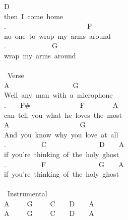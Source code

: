 {D\\
then\ I\ come\ home\\
.\ \ \ \ \ \ \ \ \ \ \ \ \ \ \ \ \ \ \ \ \ \ \ F\\
no\ one\ to\ wrap\ my\ arms\ around\\
.\ \ \ \ \ \ \ \ \ \ \ \ \ G\\
wrap\ my\ arms\ around\\
\\
\lbrack\ Verse\rbrack\\
A\ \ \ \ \ \ \ \ \ \ \ \ \ \ \ \ \ \ G\\
Well\ any\ man\ with\ a\ microphone\ \\
.\ \ \ \ F\#\ \ \ \ \ \ \ \ \ \ \ \ \ \ F\ \ \ \ \ \ \ \ A\\
can\ tell\ you\ what\ he\ loves\ the\ most\\
A\ \ \ \ \ \ \ \ \ \ \ \ \ \ \ \ \ \ \ \ G\\
And\ you\ know\ why\ you\ love\ at\ all\ \\
.\ \ \ \ \ \ \ \ \ \ C\ \ \ \ \ \ \ \ \ \ \ \ \ \ \ D\ \ \ \ A\\
if\ you're\ thinking\ of\ the\ holy\ ghost\\
.\ \ \ \ \ \ \ \ \ \ F\ \ \ \ \ \ \ \ \ \ \ \ \ \ \ G\ \ \ \ A\\
if\ you're\ thinking\ of\ the\ holy\ ghost\\
\\
\lbrack\ Instrumental\rbrack\\
A\ \ \ \ \ G\ \ \ \ \ C\ \ \ \ D\ \ \ \ A\\
A\ \ \ \ \ G\ \ \ \ \ C\ \ \ \ D\ \ \ \ A}
